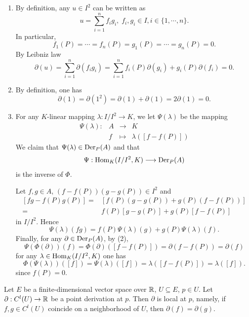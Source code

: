 \begin{proofenv}
    \quad 
    \begin{enumerate}[label=(\arabic*)]
        \item By definition, any $u \in I^2$ can be written as
            $$u = \sum_{i=1}^{n} f_i g_i,\;f_i,g_i \in I,i\in\{1,\cdots,n\}.$$
            In particular,
            $$f_1(P) = \cdots = f_n(P) = g_1(P) = \cdots = g_n(P) = 0.$$
            By Leibniz law
            $$\partial(u) = \sum_{i=1}^{n} \partial(f_i g_i) = \sum_{i=1}^{n} f_i(P) \partial(g_i) + g_i(P) \partial(f_i) = 0.$$
        \item By definition, one has 
            $$\partial(1) = \partial(1^2) = \partial(1) + \partial(1) = 2 \partial(1) = 0.$$
        \item For any $K$-linear mapping $\lambda : I/I^2 \rightarrow K$, we let $\Psi(\lambda)$ be the mapping
            $$\begin{array}{rrcl}
                \Psi(\lambda) : & A & \longrightarrow & K\\
                & f & \longmapsto & \lambda([f - f(P)])
            \end{array}$$
            We claim that $\Psi(\lambda) \in \operatorname{\mathrm{Der}}_P(A)$ and that
            $$\Psi : \operatorname{\mathrm{Hom}}_{K}(I/I^2, K) \longrightarrow \operatorname{\mathrm{Der}}_P(A)$$
            is the inverse of $\Phi$.
            
            \quad Let $f,g \in A$, $(f-f(P))(g-g(P)) \in I^2$ and
            $$\begin{aligned}
                [fg - f(P)g(P)] = & [f(P)(g - g(P)) + g(P)(f-f(P))]\\
                = & f(P)[g - g(P)] + g(P)[f - f(P)]
            \end{aligned}$$
            in $I/I^2$.
            Hence
            $$\Psi(\lambda)(fg) = f(P)\Psi(\lambda)(g) + g(P)\Psi(\lambda)(f).$$
            Finally, for any $\partial \in \operatorname{\mathrm{Der}}_P(A)$, by (2),
            $$\Psi\left(\Phi(\partial)\right)(f) = \Phi(\partial)([f - f(P)]) = \partial(f - f(P)) = \partial(f)$$
            for any $\lambda \in \operatorname{\mathrm{Hom}}_{K}(I/I^2, K)$ one has
            $$\Phi(\Psi(\lambda))([f]) = \Psi(\lambda)([f]) = \lambda([f - f(P)]) = \lambda([f]).$$
            since $f(P) = 0$.
    \end{enumerate}
\end{proofenv}

\begin{propositionenv}
    Let $E$ be a finite-dimensional vector space over $\mathbb{R}$, $U \subseteq E$, $p \in U$.
    Let $\partial : C^l(U) \rightarrow \mathbb{R}$ be a point derivation at $p$.
    Then $\partial$ is local at $p$, namely, if $f,g \in C^l(U)$ coincide on a neighborhood of $U$, 
    then $\partial(f) = \partial(g)$.
\end{propositionenv}

